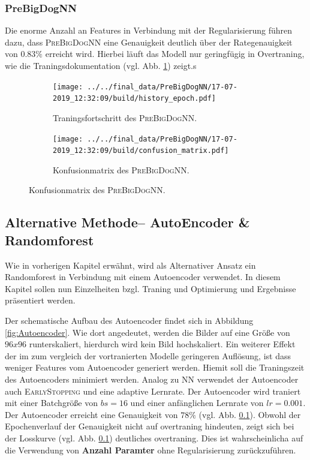 \subsubsection{PreBigDogNN}
Die enorme Anzahl an Features in Verbindung mit der Regularisierung führen dazu,
dass \textsc{PreBigDogNN} eine Genauigkeit deutlich über der Rategenauigkeit
von $0.83\%$ erreicht wird. Hierbei läuft das Modell nur geringfügig in Overtraning,
wie die Traningsdokumentation (vgl. Abb. \ref{fig:PreBigDogNN_Loss_Acc}) zeigt.s
\begin{figure}
\centering
\begin{subfigure}{0.48\textwidth}
\centering
\texttt{[image: ../../final\_data/PreBigDogNN/17-07-2019\_12:32:09/build/history\_epoch.pdf]}
\caption{Traningsfortschritt des \textsc{PreBigDogNN}.}
\label{fig:PreBigDogNN_Loss_Acc}
\end{subfigure}
\begin{subfigure}{0.48\textwidth}
\centering
\texttt{[image: ../../final\_data/PreBigDogNN/17-07-2019\_12:32:09/build/confusion\_matrix.pdf]}
\caption{Konfusionmatrix des \textsc{PreBigDogNN}.}
\label{fig:PreBigDogNN_Konfusionmatrix}
\end{subfigure}
\end{figure}

\subsection{Alternative Methode-- AutoEncoder \& Randomforest}
Wie in vorherigen Kapitel erwähnt, wird als Alternativer Ansatz ein Randomforest
in Verbindung mit einem Autoencoder verwendet. In diesem Kapitel sollen nun
Einzelheiten bzgl. Traning und Optimierung und Ergebnisse präsentiert werden.

Der schematische Aufbau des Autoencoder findet sich in Abbildung \ref{fig:Autoencoder}.
Wie dort angedeutet, werden die Bilder auf eine Größe von $96x96$ runterskaliert,
hierdurch wird kein Bild hochskaliert. Ein weiterer Effekt der im zum vergleich
der vortranierten Modelle geringeren Auflösung, ist dass weniger Features
vom Autoencoder generiert werden. Hiemit soll die Traningszeit des Autoencoders
minimiert werden. Analog zu NN verwendet der Autoencoder auch \textsc{EarlyStopping}
und eine adaptive Lernrate. Der Autoencoder wird traniert mit einer Batchgröße
von $bs=16$ und einer anfänglichen Lernrate von $lr=0.001$. Der Autoencoder
erreicht eine Genauigkeit von $78\%$ (vgl. Abb. \ref{}). Obwohl der Epochenverlauf
der Genauigkeit nicht auf overtraning hindeuten, zeigt sich bei der Losskurve
(vgl. Abb. \ref{}) deutliches overtraning. Dies ist wahrscheinlicha auf die
Verwendung von \textbf{Anzahl Paramter} ohne Regularisierung zurückzuführen.

